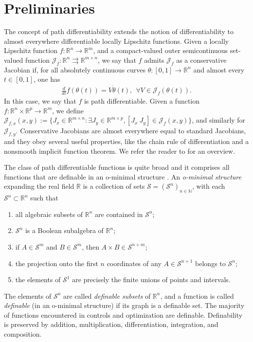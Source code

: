\documentclass[journal,twoside,web,final]{ieeecolor}
\theoremstyle{definition}
\newcommand{\R}{\mathbb{R}}
\newcommand{\N}{\mathbb{N}}
\newcommand{\J}{\mathcal{J}}
\begin{document}
\section{Preliminaries}
\label{section:prelim}
The concept of path differentiability \cite{bolte2021conservative} extends the notion of differentiability to almost everywhere differentiable locally Lipschitz functions. Given a locally Lipschitz function $f:\R^n\to\R^m$, and a compact-valued outer semicontinuous set-valued function $\mathcal{J}_f:\R^n \rightrightarrows \R^{m \times n}$, we say that $f$ admits $\mathcal{J}_f$ as a conservative Jacobian if, for all absolutely continuous curves $\theta:[0,1]\to\R^n$ and almost every $t\in[0,1]$, one has
\begin{align}
\frac{d}{dt}f(\theta(t)) = V\dot{\theta}(t), ~~ \forall V\in \mathcal{J}_f(\theta(t)). \label{eq:path_diff_definition}
\end{align}
In this case, we say that $f$ is path differentiable. 
Given a function $f:\R^n \times \R^p \to \R^m$, we define $\J_{f,x}(x,y):=\{ J_x\in\R^{m \times n} : \exists J_y\in\R^{m \times p}, [J_x~J_y]\in\J_f(x,y) \}$, and similarly for $\J_{f,y}$. 
Conservative Jacobians are almost everywhere equal to standard Jacobians, and they obey several useful properties, like the chain rule of differentiation and a nonsmooth implicit function theorem. 
We refer the reader to \cite{bolte2021conservative} for an overview.

The class of path differentiable functions is quite broad and it comprises all functions that are definable in an o-minimal structure \cite[Proposition 2]{bolte2021conservative}. An \emph{o-minimal structure} expanding the real field $\R$ is a collection of sets $\mathcal{S}=(\mathcal{S}^n)_{n\in\N}$, with each $\mathcal{S}^n \subset \R^n$ such that
\begin{enumerate}
    \item all algebraic subsets of $\R^n$ are contained in $\mathcal{S}^n$;
    \item $\mathcal{S}^n$ is a Boolean subalgebra of $\R^n$;
    \item if $A\in \mathcal{S}^m$ and $B\in \mathcal{S}^m$, then $A \times B \in \mathcal{S}^{n+m}$;
    \item the projection onto the first $n$ coordinates of any $A\in \mathcal{S}^{n+1}$ belongs to $\mathcal{S}^n$;
    \item the elements of $\mathcal{S}^1$ are precisely the finite unions of points and intervals.
\end{enumerate}
The elements of $\mathcal{S}^n$ are called \emph{definable subsets} of $\R^n$, and a function is called \emph{definable} (in an o-minimal structure) if its graph is a definable set. 
The majority of functions encountered in controls and optimization are definable. 
Definability is preserved by addition, multiplication, differentiation, integration, and composition.
\end{document}
